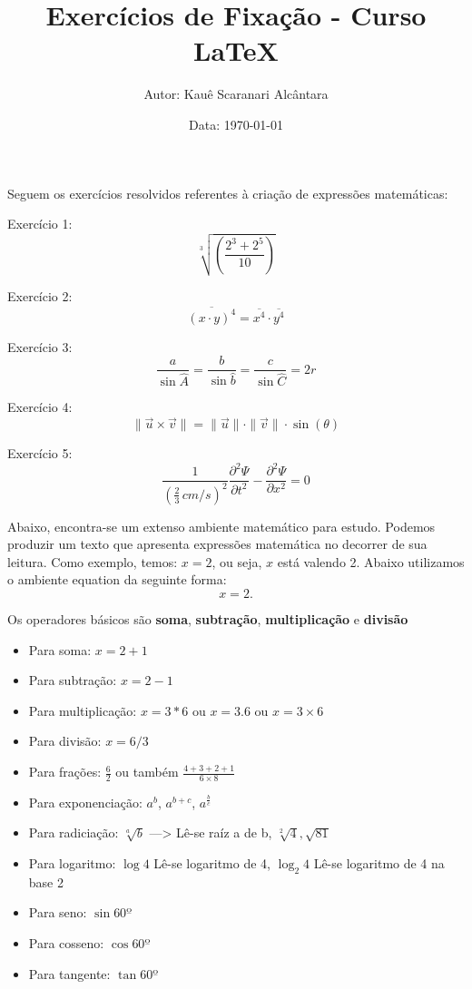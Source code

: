 \documentclass[a4paper, 12pt]{article}
\title{{\LARGE \textbf{Exercícios de Fixação - Curso LaTeX}}}
\author{Autor: Kauê Scaranari Alcântara}
\date{Data: \today}
\begin{document}
\maketitle
Seguem os exercícios resolvidos referentes à criação de expressões matemáticas:

Exercício 1:
\begin{equation}
\sqrt[3]{\left(\frac{2^{3} + 2^{5}}{10}\right)}
\end{equation}

Exercício 2:
\begin{equation}
\overline{(x \cdot y)^{4}} = \overline{x^{4}} \cdot \overline{y^{4}}
\end{equation}

Exercício 3:
\begin{equation}
\frac{a}{\sin\widehat{A}} = \frac{b}{\sin\widehat{b}} = \frac{c}{\sin\widehat{C}} = 2r
\end{equation}

Exercício 4:
\begin{equation}
\|\vec{u} \times \vec{v}\| = \|\vec{u}\| \cdot \|\vec{v}\| \cdot \sin\left(\theta\right)
\end{equation}

Exercício 5:
\begin{equation}
\frac{1}{\left(\frac{2}{3}\, cm/s \right)^{2}} \dfrac{\partial^{2}\Psi}{\partial t^{2}} - \dfrac{\partial^{2}\Psi}{\partial x^{2}} = 0
\end{equation}

\vspace{0.5cm}

Abaixo, encontra-se um extenso ambiente matemático para estudo.
Podemos produzir um texto que apresenta expressões matemática no decorrer de sua leitura. Como exemplo, temos: $x = 2$, ou seja, $x$ está valendo 2.
Abaixo utilizamos o ambiente equation da seguinte forma:
\begin{equation}
x = 2.
\end{equation}

Os operadores básicos são \textbf{soma}, \textbf{subtração}, \textbf{multiplicação} e \textbf{divisão}
\begin{itemize}
\item Para soma: $x = 2 + 1$
\item Para subtração: $x = 2 - 1$
\item Para multiplicação: $x = 3*6$ ou $x = 3.6$ ou $x = 3 \times 6$
\item Para divisão: $x = 6/3$
\item Para frações: $\frac{6}{2}$ ou também $\frac{4+3+2+1}{6\times8}$
\item Para exponenciação: $a^b$, $a^{b+c}$, $a^{\frac{b}{c}}$
\item Para radiciação: $\sqrt[a]{b}$ ---> Lê-se raíz a de b, $\sqrt[2]{4}, \sqrt{81}$
\item Para logaritmo: $\log 4$ Lê-se logaritmo de 4, $\log_{2}4$ Lê-se logaritmo de 4 na base 2
\item Para seno: $\sin 60º$
\item Para cosseno: $\cos 60º$
\item Para tangente: $\tan 60º$
\end{itemize}
\end{document}
